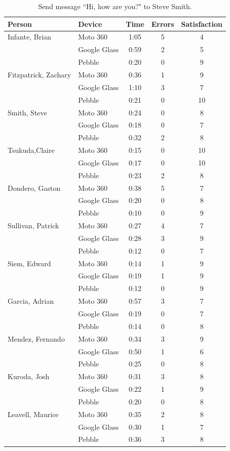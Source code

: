 \documentclass[11pt,a4paper]{scrartcl}
\begin{document}
\begin{appendices}
\begin{table}[h!]
\caption{Send message ``Hi, how are you?" to Steve Smith.} 
\centering
\begin{tabular}{@{}llccc@{}}
\toprule
Person & Device & Time & Errors & Satisfaction \\ \midrule
Infante, Brian & Moto 360 & 1:05 & 5 & 4 \\
 & Google Glass & 0:59 & 2 & 5 \\
 & Pebble & 0:20 & 0 & 9 \\
Fitzpatrick, Zachary & Moto 360 & 0:36 & 1 & 9 \\
 & Google Glass & 1:10 & 3 & 7 \\
 & Pebble & 0:21 & 0 & 10 \\
Smith, Steve & Moto 360 & 0:24 & 0 & 8 \\
 & Google Glass & 0:18 & 0 & 7 \\
 & Pebble & 0:32 & 2 & 8 \\
Tsukuda,Claire & Moto 360 & 0:15 & 0 & 10 \\
 & Google Glass & 0:17 & 0 & 10 \\
 & Pebble & 0:23 & 2 & 8 \\
Dondero, Gaston & Moto 360 & 0:38 & 5 & 7 \\
 & Google Glass & 0:20 & 0 & 8 \\
 & Pebble & 0:10 & 0 & 9 \\
Sullivan, Patrick & Moto 360 & 0:27 & 4 & 7 \\
 & Google Glass & 0:28 & 3 & 9 \\
 & Pebble & 0:12 & 0 & 7 \\
Siem, Edward & Moto 360 & 0:14 & 1 & 9 \\
 & Google Glass & 0:19 & 1 & 9 \\
 & Pebble & 0:12 & 0 & 9 \\
Garcia, Adrian & Moto 360 & 0:57 & 3 & 7 \\
 & Google Glass & 0:19 & 0 & 7 \\
 & Pebble & 0:14 & 0 & 8 \\
Mendez, Fernando & Moto 360 & 0:34 & 3 & 9 \\
 & Google Glass & 0:50 & 1 & 6 \\
 & Pebble & 0:25 & 0 & 8 \\
Kuroda, Josh & Moto 360 & 0:31 & 3 & 8 \\
 & Google Glass & 0:22 & 1 & 9 \\
 & Pebble & 0:20 & 0 & 8 \\
Leavell, Maurice & Moto 360 & 0:35 & 2 & 8 \\
 & Google Glass & 0:30 & 1 & 7 \\
 & Pebble & 0:36 & 3 & 8 \\ \bottomrule
\end{tabular}
\end{table}


\end{appendices}
\end{document}
